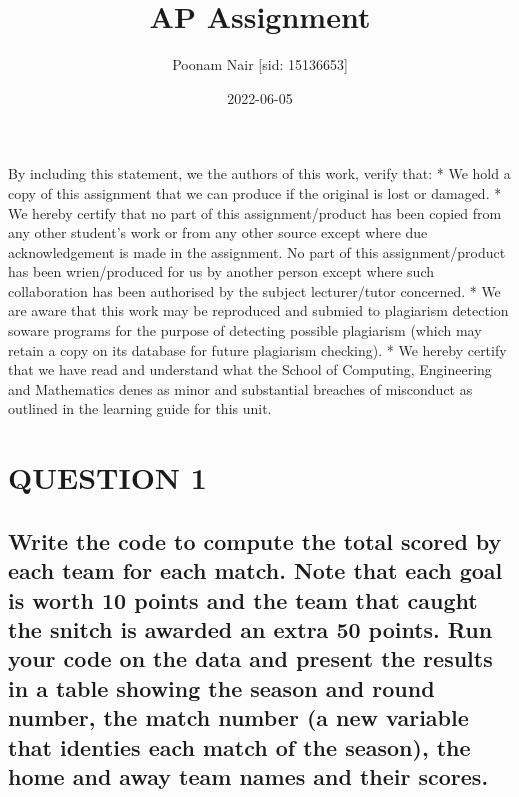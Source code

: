 \documentclass[
]{article}
\title{AP Assignment}
\author{Poonam Nair {[}sid: 15136653{]}}
\date{2022-06-05}
\begin{document}
\maketitle

By including this statement, we the authors of this work, verify that: *
We hold a copy of this assignment that we can produce if the original is
lost or damaged. * We hereby certify that no part of this
assignment/product has been copied from any other student's work or from
any other source except where due acknowledgement is made in the
assignment. No part of this assignment/product has been wrien/produced
for us by another person except where such collaboration has been
authorised by the subject lecturer/tutor concerned. * We are aware that
this work may be reproduced and submied to plagiarism detection soware
programs for the purpose of detecting possible plagiarism (which may
retain a copy on its database for future plagiarism checking). * We
hereby certify that we have read and understand what the School of
Computing, Engineering and Mathematics denes as minor and substantial
breaches of misconduct as outlined in the learning guide for this unit.

\hypertarget{question-1}{%
\section{QUESTION 1}\label{question-1}}

\hypertarget{write-the-code-to-compute-the-total-scored-by-each-team-for-each-match.-note-that-each-goal-is-worth-10-points-and-the-team-that-caught-the-snitch-is-awarded-an-extra-50-points.-run-your-code-on-the-data-and-present-the-results-in-a-table-showing-the-season-and-round-number-the-match-number-a-new-variable-that-identies-each-match-of-the-season-the-home-and-away-team-names-and-their-scores.}{%
\subsection{Write the code to compute the total scored by each team for
each match. Note that each goal is worth 10 points and the team that
caught the snitch is awarded an extra 50 points. Run your code on the
data and present the results in a table showing the season and round
number, the match number (a new variable that identies each match of
the season), the home and away team names and their
scores.}\label{write-the-code-to-compute-the-total-scored-by-each-team-for-each-match.-note-that-each-goal-is-worth-10-points-and-the-team-that-caught-the-snitch-is-awarded-an-extra-50-points.-run-your-code-on-the-data-and-present-the-results-in-a-table-showing-the-season-and-round-number-the-match-number-a-new-variable-that-identies-each-match-of-the-season-the-home-and-away-team-names-and-their-scores.}}
\end{document}
